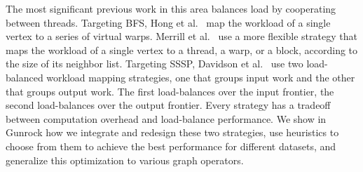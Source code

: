 \documentclass[format=acmsmall,review=false,screen=true]{acmart}
\begin{document}
\begin{table}
  \caption[Traversal throughput optimization strategies in Gunrock.]{Four graph
  traversal throughput optimization strategies and their corresponding module
  names in Gunrock implementation, where LB\_LIGHT processes load balance over
  input frontier, LB processes load balance over output frontier, and LB\_CULL
  combines LB and LB\_LIGHT with a follow-up filter into a fused
  kernel.
    \label{tab:advance}}
\end{table}

The most significant previous work in this area balances load by
cooperating between threads. Targeting BFS, Hong et
al.~ map the workload of a single vertex to a
series of virtual warps. Merrill et al.~
use a more flexible strategy that  maps the workload of a single
vertex to a thread, a warp, or a block, according to the size of its
neighbor list. Targeting SSSP, Davidson et
al.~ use two load-balanced workload
mapping strategies, one that groups input work and the other that
groups output work. The first load-balances over the input
frontier, the second load-balances over the output frontier. Every
strategy has a tradeoff between computation overhead and load-balance
performance. We show in Gunrock how we integrate and redesign these
two strategies, use heuristics to choose from them to achieve the best
performance for different datasets, and generalize this optimization
to various graph operators.
\end{document}
